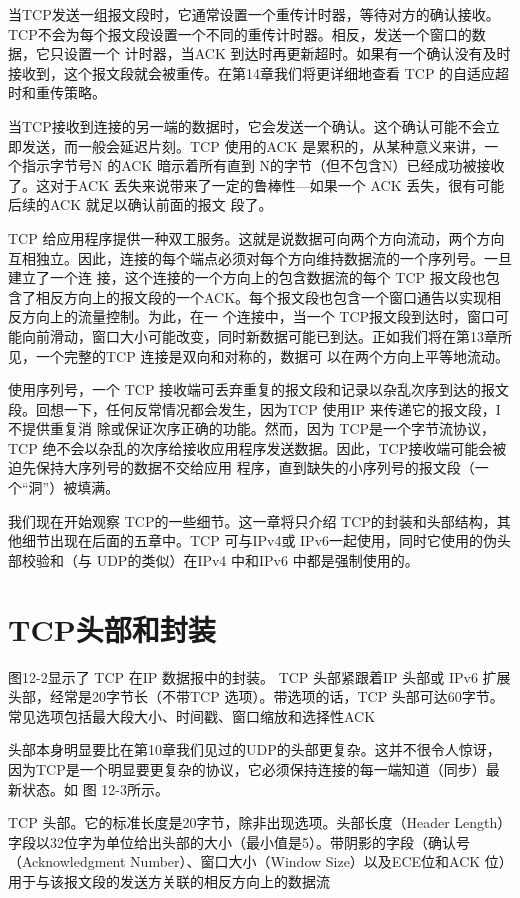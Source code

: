 当TCP发送一组报文段时，它通常设置一个重传计时器，等待对方的确认接收。TCP不会为每个报文段设置一个不同的重传计时器。相反，发送一个窗口的数据，它只设置一个
计时器，当ACK 到达时再更新超时。如果有一个确认没有及时接收到，这个报文段就会被重传。在第14章我们将更详细地查看 TCP 的自适应超时和重传策略。

当TCP接收到连接的另一端的数据时，它会发送一个确认。这个确认可能不会立即发送，而一般会延迟片刻。TCP 使用的ACK 是累积的，从某种意义来讲，一个指示字节号N
的ACK 暗示着所有直到 N的字节（但不包含N）已经成功被接收了。这对于ACK 丢失来说带来了一定的鲁棒性—如果一个 ACK 丢失，很有可能后续的ACK 就足以确认前面的报文
段了。

TCP 给应用程序提供一种双工服务。这就是说数据可向两个方向流动，两个方向互相独立。因此，连接的每个端点必须对每个方向维持数据流的一个序列号。一旦建立了一个连
接，这个连接的一个方向上的包含数据流的每个 TCP 报文段也包含了相反方向上的报文段的一个ACK。每个报文段也包含一个窗口通告以实现相反方向上的流量控制。为此，在一
个连接中，当一个 TCP报文段到达时，窗口可能向前滑动，窗口大小可能改变，同时新数据可能已到达。正如我们将在第13章所见，一个完整的TCP 连接是双向和对称的，数据可
以在两个方向上平等地流动。

使用序列号，一个 TCP 接收端可丢弃重复的报文段和记录以杂乱次序到达的报文段。回想一下，任何反常情况都会发生，因为TCP 使用IP 来传递它的报文段，I不提供重复消
除或保证次序正确的功能。然而，因为 TCP是一个字节流协议，TCP 绝不会以杂乱的次序给接收应用程序发送数据。因此，TCP接收端可能会被迫先保持大序列号的数据不交给应用
程序，直到缺失的小序列号的报文段（一个“洞”）被填满。

我们现在开始观察 TCP的一些细节。这一章将只介绍 TCP的封装和头部结构，其他细节出现在后面的五章中。TCP 可与IPv4或 IPv6一起使用，同时它使用的伪头部校验和（与
UDP的类似）在IPv4 中和IPv6 中都是强制使用的。
\section{TCP头部和封装}
图12-2显示了 TCP 在IP 数据报中的封装。
TCP 头部紧跟着IP 头部或 IPv6 扩展头部，经常是20字节长（不带TCP 选项）。带选项的话，TCP 头部可达60字节。常见选项包括最大段大小、时间戳、窗口缩放和选择性ACK

头部本身明显要比在第10章我们见过的UDP的头部更复杂。这并不很令人惊讶，因为TCP是一个明显要更复杂的协议，它必须保持连接的每一端知道（同步）最新状态。如
图 12-3所示。

TCP 头部。它的标准长度是20字节，除非出现选项。头部长度（Header Length）字段以32位字为单位给出头部的大小（最小值是5）。带阴影的字段（确认号（Acknowledgment
Number）、窗口大小（Window Size）以及ECE位和ACK 位）用于与该报文段的发送方关联的相反方向上的数据流

